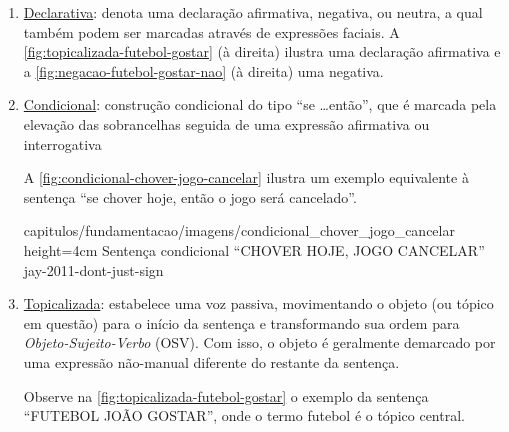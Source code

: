 \begin{enumerate}
\begin{enumerate}
                    {capitulos/fundamentacao/imagens/interrogativa_joao_gostar} %
                    {height=3cm} %
                    {Sentença interrogativa ``JOÃO GOSTAR QUEM?''} %
                    {quadros-2004-estudos-linguisticos} %


              \item \underline{Declarativa}: denota uma declaração afirmativa, negativa, ou neutra, a qual também podem ser marcadas através de expressões faciais.
                    A \autoref{fig:topicalizada-futebol-gostar} (à direita) ilustra uma declaração afirmativa e a \autoref{fig:negacao-futebol-gostar-nao} (à direita) uma negativa.



              \item \underline{Condicional}: construção condicional do tipo ``se \dots então'', que é marcada pela elevação das sobrancelhas seguida de uma expressão afirmativa ou interrogativa

                    A \autoref{fig:condicional-chover-jogo-cancelar} ilustra um exemplo equivalente à sentença ``se chover hoje, então o jogo será cancelado''.

                    {capitulos/fundamentacao/imagens/condicional_chover_jogo_cancelar} %
                    {height=4cm} %
                    {Sentença condicional ``CHOVER HOJE, JOGO CANCELAR''} %
                    {jay-2011-dont-just-sign} %


              \item \underline{Topicalizada}: estabelece uma voz passiva, movimentando o objeto (ou tópico em questão) para o início da sentença e transformando sua ordem para \textit{Objeto-Sujeito-Verbo} (OSV). Com isso, o objeto é geralmente demarcado por uma expressão não-manual diferente do restante da sentença.

                    Observe na \autoref{fig:topicalizada-futebol-gostar} o exemplo da sentença ``FUTEBOL JOÃO GOSTAR'', onde o termo futebol é o tópico central.



\end{enumerate}
\end{enumerate}
